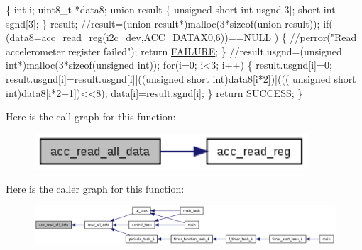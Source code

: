 \begin{DoxyCode}
\{
  \textcolor{keywordtype}{int} i;
  uint8\_t *data8;
  \textcolor{keyword}{union }result
  \{
    \textcolor{keywordtype}{unsigned} \textcolor{keywordtype}{short} \textcolor{keywordtype}{int} usgnd[3];
    \textcolor{keywordtype}{short} \textcolor{keywordtype}{int} sgnd[3];
  \} result;
  \textcolor{comment}{//result=(union result*)malloc(3*sizeof(union result));}
  \textcolor{keywordflow}{if}( (data8=\hyperlink{group__acc_ga2a91c44eebbe44f4d3b8c508633512f9}{acc\_read\_reg}(i2c\_dev,\hyperlink{imu__regs_8h_afae448fbad872220013e5c3abf0f3d9f}{ACC\_DATAX0},6))==NULL )
  \{
    \textcolor{comment}{//perror("Read accelerometer register failed");}
    \textcolor{keywordflow}{return} \hyperlink{calibration_2calibration_8h_a6d58f9ac447476b4e084d7ca383f5183}{FAILURE};
  \}
  \textcolor{comment}{//result.usgnd=(unsigned int*)malloc(3*sizeof(unsigned int));}
  \textcolor{keywordflow}{for}(i=0; i<3; i++)
  \{
    result.usgnd[i]=0;
    result.usgnd[i]=result.usgnd[i]|((\textcolor{keywordtype}{unsigned} \textcolor{keywordtype}{short} int)data8[i*2])|(((\textcolor{keywordtype}{
      unsigned} \textcolor{keywordtype}{short} int)data8[i*2+1])<<8);
    data[i]=result.sgnd[i];
  \}
  \textcolor{keywordflow}{return} \hyperlink{calibration_2calibration_8h_aa90cac659d18e8ef6294c7ae337f6b58}{SUCCESS};  
\}
\end{DoxyCode}


Here is the call graph for this function\-:
\nopagebreak
\begin{figure}[H]
\begin{center}
\leavevmode
\includegraphics[width=288pt]{group__acc_ga013bb5ed8a763883fc440549d2b1a6ce_cgraph}
\end{center}
\end{figure}




Here is the caller graph for this function\-:
\nopagebreak
\begin{figure}[H]
\begin{center}
\leavevmode
\includegraphics[width=350pt]{group__acc_ga013bb5ed8a763883fc440549d2b1a6ce_icgraph}
\end{center}
\end{figure}


